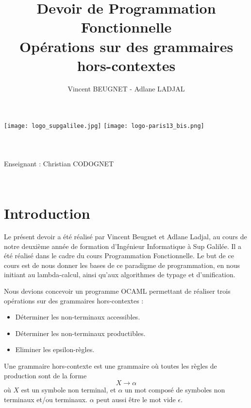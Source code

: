 \documentclass[11pt,a4paper]{article}
\author{Vincent BEUGNET - Adlane LADJAL}
\title{Devoir de Programmation Fonctionnelle \\ Opérations sur des grammaires hors-contextes}
\begin{document}
\makeatletter
\begin{titlepage}
	\centering
	\texttt{[image: logo\_supgalilee.jpg]}
	\hfill
	\texttt{[image: logo-paris13\_bis.png]} \\
    \vspace{5cm}
       {\LARGE \textbf{\@title}} \\
    \vspace{2em}
        {\large \@author }\\
    \vspace{1em}
        {\textit{\@date}} \\
    \vspace{2em}
    	\vspace{2em}
    		{Enseignant : Christian CODOGNET} \\
    \vfill
\end{titlepage}


\newpage
~
\newpage

\renewcommand{\contentsname}{Sommaire}
\tableofcontents

\newpage

\pagestyle{plain}

\section{Introduction}
Le présent devoir a été réalisé par Vincent Beugnet
et Adlane Ladjal, au cours de notre deuxième année
de formation d'Ingénieur Informatique à  Sup Galilée.
Il a été réalisé dans le cadre du cours Programmation
Fonctionnelle. Le but de ce cours est de nous donner
les bases de ce paradigme de programmation, en nous
initiant au lambda-calcul, ainsi qu'aux algorithmes de
typage et d'unification.

Nous devions concevoir un programme OCAML permettant de
réaliser trois opérations sur des grammaires hors-contextes :

\begin{itemize}
    \item Déterminer les non-terminaux accessibles.
    \item Déterminer les non-terminaux productibles.
    \item Eliminer les epsilon-règles.
\end{itemize}

Une grammaire hors-contexte est une grammaire où toutes les
règles de production sont de la forme \[ X \rightarrow \alpha \]
où $X$ est un symbole non terminal, et $\alpha$ un mot composé
de symboles non terminaux et/ou terminaux. $\alpha$ peut aussi
être le mot vide $\epsilon$.
\newpage
\end{document}
